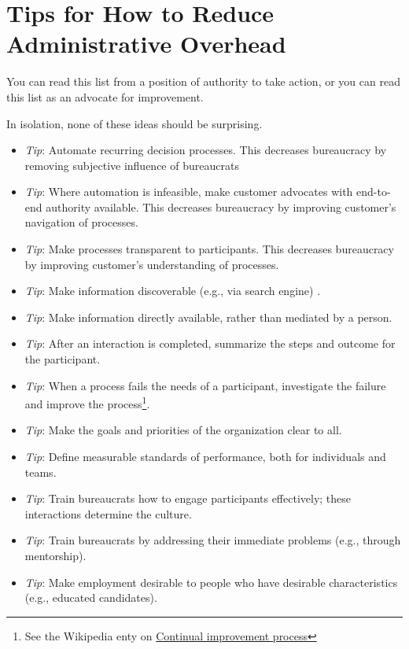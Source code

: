 \section{Tips for How to Reduce Administrative Overhead\label{sec:reducing-overhead}}

You can read this list from a position of authority to take action, or you can read this list as an advocate for improvement. 

In isolation, none of these ideas should be surprising.
\begin{itemize}
    \item \textit{Tip}: Automate recurring decision processes. This decreases bureaucracy by removing subjective influence of bureaucrats
\item \textit{Tip}: Where automation is infeasible, make customer advocates with end-to-end authority available. 
This decreases bureaucracy by improving customer's navigation of processes.
\item \textit{Tip}: Make processes transparent to participants. 
This decreases bureaucracy by improving customer's understanding of processes.
\item \textit{Tip}: Make information discoverable (e.g., via search engine) .
\item \textit{Tip}: Make information directly available, rather than mediated by a person.
\item \textit{Tip}: After an interaction is completed, summarize the steps and outcome for the participant. 
\item \textit{Tip}: When a process fails the needs of a participant, investigate the failure and improve the process\footnote{See the Wikipedia enty on \href{https://en.wikipedia.org/wiki/Continual_improvement_process}{Continual improvement process}}. 
\item \textit{Tip}: Make the goals and priorities of the organization clear to all.
\item \textit{Tip}: Define measurable standards of performance, both for individuals and teams.
\item \textit{Tip}: Train bureaucrats how to engage participants effectively; these interactions determine the culture.
\item \textit{Tip}: Train bureaucrats by addressing their immediate problems (e.g., through mentorship).
\item \textit{Tip}: Make employment desirable to people who have desirable characteristics (e.g., educated candidates).

\end{itemize}
